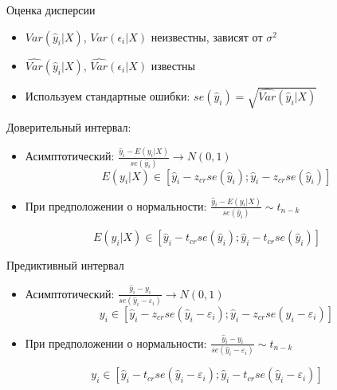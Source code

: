 \documentclass[ignorenonframetext,]{beamer}
\begin{document}
\begin{frame}{Оценка дисперсии}

\begin{itemize}
\item
  $Var(\hat{y}_i |X )$, $Var(\epsilon_i | X)$ неизвестны, зависят от
  $\sigma^2$
\item
  $\widehat{Var}(\hat{y}_i |X )$, $\widehat{Var}(\epsilon_i | X)$
  известны
\item
  Используем стандартные ошибки:
  $se(\hat{y}_i) = \sqrt{\widehat{Var}(\hat{y}_i |X )}$
\end{itemize}

\end{frame}

\begin{frame}{Доверительный интервал:}

\begin{itemize}
\item
  Асимптотический:
  $\frac{\hat{y}_i - E(y_i | X)}{se(\hat{y}_i)} \to N(0,1)$ \[
  E(y_i | X) \in [\hat{y}_i - z_{cr} se(\hat{y}_i);\hat{y}_i - z_{cr} se(\hat{y}_i) ]
  \]
\item
  При предположении о нормальности:
  $\frac{\hat{y}_i - E(y_i | X)}{se(\hat{y}_i)} \sim t_{n-k}$
\end{itemize}

\[
E(y_i | X) \in [\hat{y}_i - t_{cr} se(\hat{y}_i);\hat{y}_i - t_{cr} se(\hat{y}_i) ]
\]

\end{frame}

\begin{frame}{Предиктивный интервал}

\begin{itemize}
\item
  Асимптотический:
  $\frac{\hat{y}_i - y_i }{se(\hat{y}_i-\varepsilon_i)} \to N(0,1)$ \[
  y_i  \in [\hat{y}_i - z_{cr} se(\hat{y}_i-\varepsilon_i);\hat{y}_i - z_{cr} se(\hat{y}_i-\varepsilon_i) ]
  \]
\item
  При предположении о нормальности:
  $\frac{\hat{y}_i - y_i }{se(\hat{y}_i-\varepsilon_i)} \sim t_{n-k}$
\end{itemize}

\[
y_i  \in [\hat{y}_i - t_{cr} se(\hat{y}_i-\varepsilon_i);\hat{y}_i - t_{cr} se(\hat{y}_i-\varepsilon_i) ]
\]

\end{frame}
\end{document}
